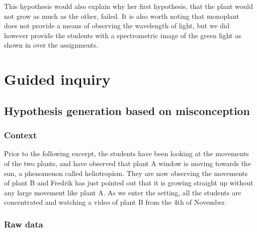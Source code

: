 This hypothesis would also explain why her first hypothesis, that the plant would not grow as much as the other, failed. It is also worth noting that monoplant does not provide a means of observing the wavelength of light, but we did however provide the students with a spectrometric image of the green light as shown in over the assignments.

\section{Guided inquiry}
\label{cha:guidedinquiry}

\subsection{Hypothesis generation based on misconception}

\subsubsection*{Context}
Prior to the following excerpt, the students have been looking at the movements of the two plants, and have observed that plant A window is moving towards the sun, a phenomenon called heliotropism. They are now observing the movements of plant B and Fredrik has just pointed out that it is growing straight up without any large movement like plant A. As we enter the setting, all the students are concentrated and watching a video of plant B from the 4th of November.


\subsubsection*{Raw data}

